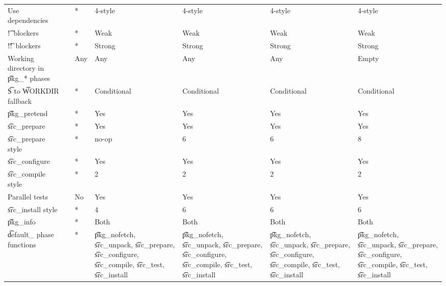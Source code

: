 \begin{landscape}
\begin{longtable}{llP{7.5em}P{7.5em}P{7.5em}P{7.5em}P{7.5em}}
Use dependencies &  &
    * & 4-style & 4-style & 4-style & 4-style \\

\t{!}\ blockers &  &
    * & Weak & Weak & Weak & Weak \\

\t{!!}\ blockers &  &
    * & Strong & Strong & Strong & Strong \\

Working directory in \t{pkg_*} phases &  &
    Any & Any & Any & Any & Empty \\

\t{S} to \t{WORKDIR} fallback &  &
    * & Conditional & Conditional & Conditional & Conditional \\

\t{pkg_pretend} &  &
    * & Yes & Yes & Yes & Yes \\

\t{src_prepare} &  &
    * & Yes & Yes & Yes & Yes \\

\t{src_prepare} style &  &
    * & no-op & 6 & 6 & 8 \\

\t{src_configure} &  &
    * & Yes & Yes & Yes & Yes \\

\t{src_compile} style &  &
    * & 2 & 2 & 2 & 2 \\

Parallel tests &  &
    No & Yes & Yes & Yes & Yes \\

\t{src_install} style &  &
    * & 4 & 6 & 6 & 6 \\

\t{pkg_info} &  &
    * & Both & Both & Both & Both \\

\t{default_} phase functions &  &
    * &
    \t{pkg_nofetch}, \t{src_unpack}, \t{src_prepare}, \t{src_configure},
        \t{src_compile}, \t{src_test}, \t{src_install} &
    \t{pkg_nofetch}, \t{src_unpack}, \t{src_prepare}, \t{src_configure},
        \t{src_compile}, \t{src_test}, \t{src_install} &
    \t{pkg_nofetch}, \t{src_unpack}, \t{src_prepare}, \t{src_configure},
        \t{src_compile}, \t{src_test}, \t{src_install} &
    \t{pkg_nofetch}, \t{src_unpack}, \t{src_prepare}, \t{src_configure},
        \t{src_compile}, \t{src_test}, \t{src_install} \\


\end{longtable}
\end{landscape}
